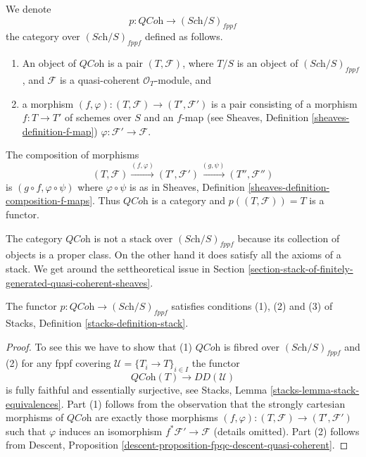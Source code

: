\noindent
We denote
$$
p : \textit{QCoh} \to (\textit{Sch}/S)_{fppf}
$$
the category over $(\textit{Sch}/S)_{fppf}$ defined as follows.
\begin{enumerate}
\item An object of $\textit{QCoh}$ is a pair $(T, \mathcal{F})$,
where $T/S$ is an object of $(\textit{Sch}/S)_{fppf}$, and $\mathcal{F}$
is a quasi-coherent $\mathcal{O}_T$-module, and
\item a morphism $(f, \varphi) : (T, \mathcal{F}) \to (T', \mathcal{F}')$
is a pair consisting of a morphism $f : T \to T'$ of schemes over $S$
and an $f$-map (see
Sheaves, Definition \ref{sheaves-definition-f-map})
$\varphi : \mathcal{F}' \to \mathcal{F}$.
\end{enumerate}
The composition of morphisms
$$
(T, \mathcal{F}) \xrightarrow{(f, \varphi)}
(T', \mathcal{F}') \xrightarrow{(g, \psi)} (T'', \mathcal{F}'')
$$
is $(g \circ f, \varphi \circ \psi)$ where $\varphi \circ \psi$ is
as in
Sheaves, Definition \ref{sheaves-definition-composition-f-maps}.
Thus $\textit{QCoh}$ is a category and $p((T, \mathcal{F})) = T$
is a functor.

\medskip\noindent
The category $\textit{QCoh}$ is not a stack over $(\textit{Sch}/S)_{fppf}$
because its collection of objects is a proper class. On the other hand
it does satisfy all the axioms of a stack. We get around the
settheoretical issue in
Section \ref{section-stack-of-finitely-generated-quasi-coherent-sheaves}.

\begin{lemma}
\label{lemma-stack-of-quasi-coherent-sheaves}
The functor $p : \textit{QCoh} \to (\textit{Sch}/S)_{fppf}$
satisfies conditions (1), (2) and (3) of
Stacks, Definition \ref{stacks-definition-stack}.
\end{lemma}

\begin{proof}
To see this we have to show that (1) $\textit{QCoh}$ is fibred over
$(\textit{Sch}/S)_{fppf}$ and (2) for any fppf covering
$\mathcal{U} = \{T_i \to T\}_{i \in I}$ the functor
$$
\textit{QCoh}(T) \longrightarrow DD(\mathcal{U})
$$
is fully faithful and essentially surjective, see
Stacks, Lemma \ref{stacks-lemma-stack-equivalences}.
Part (1) follows from the observation that the strongly cartesian morphisms
of $\textit{QCoh}$ are exactly those morphisms
$(f, \varphi) : (T, \mathcal{F}) \to (T', \mathcal{F}')$
such that $\varphi$ induces an isomorphism
$f^*\mathcal{F}' \to \mathcal{F}$ (details omitted).
Part (2) follows from
Descent, Proposition \ref{descent-proposition-fpqc-descent-quasi-coherent}.
\end{proof}





